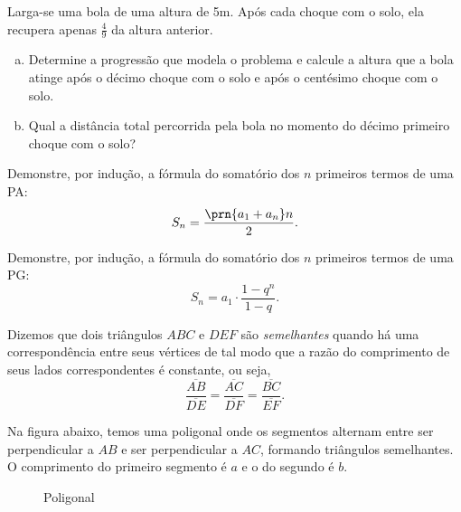 \begin{exercise}
    Larga-se uma bola de uma altura de 5m. Após cada choque com o
solo, ela recupera apenas $\frac 4 9 $ da altura anterior. 
%
\begin{enumerate}[a)]
    \item Determine a progressão que modela o problema e calcule 
    a altura que a bola atinge após o décimo choque com o solo
    e após o centésimo choque com o solo.
    \item Qual a distância total percorrida pela bola no momento 
    do décimo primeiro choque com o solo? 
\end{enumerate}
\end{exercise}

\begin{exercise}
	Demonstre, por indução, a fórmula do somatório dos $n$ primeiros termos de uma PA:
	\[S_n = \frac {\prn {a_1+a_n}n} 2.\]
\end{exercise}

\begin{exercise}
	Demonstre, por indução, a fórmula do somatório dos $n$ primeiros termos de uma PG:
	\[S_n = a_1 \cdot \frac{1-q^n}{1-q}.\]
\end{exercise}

\begin{exercise}
   Dizemos que dois triângulos $ABC$ e $DEF$ são \emph{semelhantes} quando há uma correspondência entre seus vértices de tal modo que a razão do comprimento de seus lados correspondentes é constante, ou seja,
   $$ \dfrac{\overline{AB}}{\overline{DE}} = \dfrac{\overline{AC}}{\overline{DF}} = \dfrac{\overline{BC}}{\overline{EF}}.$$

    Na figura abaixo, temos uma poligonal onde os segmentos alternam entre ser perpendicular a $AB$ e ser perpendicular a $AC$, formando triângulos semelhantes. O comprimento do primeiro segmento é $a$ e o do segundo é $b$.
    \begin{figure}[H]
	\centering
        \caption{Poligonal}
        \label{fig:my_label}
    \end{figure}
\end{exercise}


